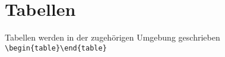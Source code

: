 \chapter{Tabellen}

Tabellen werden in der zugehörigen Umgebung geschrieben \verb|\begin{table}\end{table}|

	

